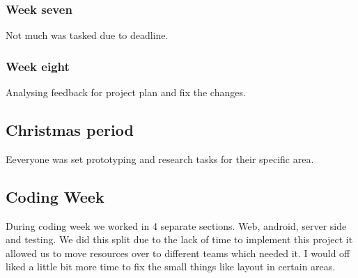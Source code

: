 \subsubsection{Week seven}
	Not much was tasked due to deadline.
\subsubsection{Week eight}
	Analysing feedback for project plan and fix the changes.
\subsection{Christmas period}
	Eeveryone was set prototyping and research tasks for their specific area.
\subsection{Coding Week}
	During coding week we worked in 4 separate sections. Web, android, server side and testing. We did this split due to the lack of time to implement this project it allowed us to move resources over to different teams which needed it. I would off liked a little bit more time to fix the small things like layout in certain areas.